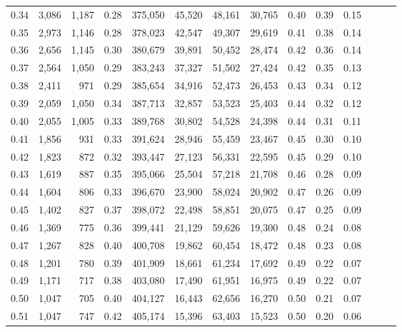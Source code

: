 \begin{tabular}{rrrrrrrrrrrrrr}
0.34 &   3,086 &  1,187 &  0.28 &  375,050 &   45,520 &  48,161 &  30,765 &  0.40 &  0.39 &      0.15 \\
0.35 &   2,973 &  1,146 &  0.28 &  378,023 &   42,547 &  49,307 &  29,619 &  0.41 &  0.38 &      0.14 \\
0.36 &   2,656 &  1,145 &  0.30 &  380,679 &   39,891 &  50,452 &  28,474 &  0.42 &  0.36 &      0.14 \\
0.37 &   2,564 &  1,050 &  0.29 &  383,243 &   37,327 &  51,502 &  27,424 &  0.42 &  0.35 &      0.13 \\
0.38 &   2,411 &    971 &  0.29 &  385,654 &   34,916 &  52,473 &  26,453 &  0.43 &  0.34 &      0.12 \\
0.39 &   2,059 &  1,050 &  0.34 &  387,713 &   32,857 &  53,523 &  25,403 &  0.44 &  0.32 &      0.12 \\
0.40 &   2,055 &  1,005 &  0.33 &  389,768 &   30,802 &  54,528 &  24,398 &  0.44 &  0.31 &      0.11 \\
0.41 &   1,856 &    931 &  0.33 &  391,624 &   28,946 &  55,459 &  23,467 &  0.45 &  0.30 &      0.10 \\
0.42 &   1,823 &    872 &  0.32 &  393,447 &   27,123 &  56,331 &  22,595 &  0.45 &  0.29 &      0.10 \\
0.43 &   1,619 &    887 &  0.35 &  395,066 &   25,504 &  57,218 &  21,708 &  0.46 &  0.28 &      0.09 \\
0.44 &   1,604 &    806 &  0.33 &  396,670 &   23,900 &  58,024 &  20,902 &  0.47 &  0.26 &      0.09 \\
0.45 &   1,402 &    827 &  0.37 &  398,072 &   22,498 &  58,851 &  20,075 &  0.47 &  0.25 &      0.09 \\
0.46 &   1,369 &    775 &  0.36 &  399,441 &   21,129 &  59,626 &  19,300 &  0.48 &  0.24 &      0.08 \\
0.47 &   1,267 &    828 &  0.40 &  400,708 &   19,862 &  60,454 &  18,472 &  0.48 &  0.23 &      0.08 \\
0.48 &   1,201 &    780 &  0.39 &  401,909 &   18,661 &  61,234 &  17,692 &  0.49 &  0.22 &      0.07 \\
0.49 &   1,171 &    717 &  0.38 &  403,080 &   17,490 &  61,951 &  16,975 &  0.49 &  0.22 &      0.07 \\
0.50 &   1,047 &    705 &  0.40 &  404,127 &   16,443 &  62,656 &  16,270 &  0.50 &  0.21 &      0.07 \\
0.51 &   1,047 &    747 &  0.42 &  405,174 &   15,396 &  63,403 &  15,523 &  0.50 &  0.20 &      0.06 \\

\end{tabular}
